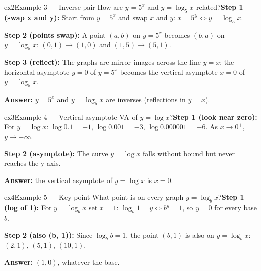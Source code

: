 \documentclass[11pt]{article}
\begin{document}
\begin{example}{ex2}{Example 3 --- Inverse pair}
How are $y=5^x$ and $y=\log_5 x$ related?\soln \textbf{Step 1 (swap x and y):} Start from $y=5^x$ and swap $x$ and $y$: $x=5^y\iff y=\log_5x$.

\textbf{Step 2 (points swap):} A point $(a,b)$ on $y=5^x$ becomes $(b,a)$ on $y=\log_5x$: $(0,1)\to(1,0)$ and $(1,5)\to(5,1)$.

\textbf{Step 3 (reflect):} The graphs are mirror images across the line $y=x$; the horizontal asymptote $y=0$ of $y=5^x$ becomes the vertical asymptote $x=0$ of $y=\log_5x$.

\textbf{Answer:} $y=5^x$ and $y=\log_5x$ are inverses (reflections in $y=x$).

\end{example}

\begin{example}{ex3}{Example 4 --- Vertical asymptote}
VA of $y=\log x$?\soln \textbf{Step 1 (look near zero):} For $y=\log x$: $\log0.1=-1$, $\log0.001=-3$, $\log0.000001=-6$. As $x\to0^+$, $y\to-\infty$.

\textbf{Step 2 (asymptote):} The curve $y=\log x$ falls without bound but never reaches the y-axis.

\textbf{Answer:} the vertical asymptote of $y=\log x$ is $x=0$.
\end{example}

\begin{example}{ex4}{Example 5 --- Key point}
What point is on every graph $y=\log_b x$?\soln \textbf{Step 1 (log of 1):} For $y=\log_bx$ set $x=1$: $\log_b1=y\iff b^y=1$, so $y=0$ for every base $b$.

\textbf{Step 2 (also (b, 1)):} Since $\log_bb=1$, the point $(b,1)$ is also on $y=\log_bx$: $(2,1)$, $(5,1)$, $(10,1)$.

\textbf{Answer:} $(1,0)$, whatever the base.

\end{example}
\end{document}
